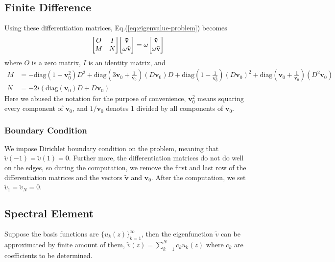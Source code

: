 \subsection{Finite Difference}
Using these differentiation matrices, Eq.(\ref{eq:eigenvalue-problem}) becomes
\begin{equation}
	\mqty[ O & I\\ M & N ]\mqty[ \mathbf{\tilde{v}}\\ \omega\mathbf{\tilde{v}} ] = \omega\mqty[ \mathbf{\tilde{v}}\\ \omega\mathbf{\tilde{v}} ]
\end{equation}
where $O$ is a zero matrix, $I$ is an identity matrix, and
\begin{align*}
	M &= -\text{diag}(1-\mathbf{v}_0^2)D^2 
	+\text{diag}\left(3\mathbf{v}_0 + \frac{1}{\mathbf{v}_0}\right) (D\mathbf{v}_0)D 
	+\text{diag}\left(1-\frac{1}{\mathbf{v}_0^2}\right)\left(D\mathbf{v}_0\right)^2 
	+\text{diag}\left(\mathbf{v}_0+\frac{1}{\mathbf{v}_0}\right)(D^2\mathbf{v}_0) \\
	N &= -2i\left(\text{diag}(\mathbf{v}_0)D + D\mathbf{v}_0 \right) 
\end{align*}
Here we abused the notation for the purpose of convenience, $\mathbf{v}_0^2$ means squaring every component of $\mathbf{v}_0$, and $1/\mathbf{v}_0$ denotes 1 divided by all components of $\mathbf{v}_0$.

\subsubsection{Boundary Condition}
We impose Dirichlet boundary condition on the problem, meaning that $\tilde{v}(-1)=\tilde{v}(1)=0$. Further more, the differentiation matrices do not do well on the edges, so during the computation, we remove the first and last row of the differentiation matrices and the vectors $\mathbf{\tilde{v}}$ and $\mathbf{v}_0$. After the computation, we set $\tilde{v}_1=\tilde{v}_N = 0$.


\subsection{Spectral Element}
Suppose the basis functions are $\{u_k(z)\}_{k=1}^\infty$, then the eigenfunction $\tilde{v}$ can be approximated by finite amount of them, $\tilde{v}(z) = \sum_{k=1}^N c_ku_k(z)$ where $c_k$ are coefficients to be determined.

